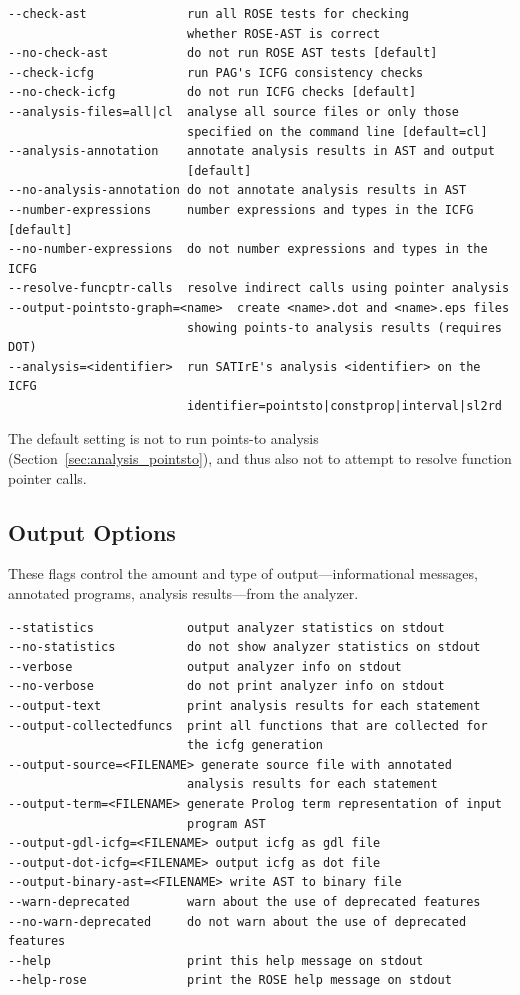 \documentclass[a4paper,12pt]{report}
\begin{document}
{\footnotesize
\begin{verbatim}
--check-ast              run all ROSE tests for checking
                         whether ROSE-AST is correct
--no-check-ast           do not run ROSE AST tests [default]
--check-icfg             run PAG's ICFG consistency checks
--no-check-icfg          do not run ICFG checks [default]
--analysis-files=all|cl  analyse all source files or only those
                         specified on the command line [default=cl]
--analysis-annotation    annotate analysis results in AST and output
                         [default]
--no-analysis-annotation do not annotate analysis results in AST
--number-expressions     number expressions and types in the ICFG [default]
--no-number-expressions  do not number expressions and types in the ICFG
--resolve-funcptr-calls  resolve indirect calls using pointer analysis
--output-pointsto-graph=<name>  create <name>.dot and <name>.eps files
                         showing points-to analysis results (requires DOT)
--analysis=<identifier>  run SATIrE's analysis <identifier> on the ICFG
                         identifier=pointsto|constprop|interval|sl2rd
\end{verbatim}
}

The default setting is not to run points-to analysis
(Section~\ref{sec:analysis_pointsto}), and thus also not to attempt to
resolve function pointer calls.

\subsection{Output Options}

These flags control the amount and type of output---informational messages,
annotated programs, analysis results---from the analyzer.

{\footnotesize
\begin{verbatim}
--statistics             output analyzer statistics on stdout
--no-statistics          do not show analyzer statistics on stdout
--verbose                output analyzer info on stdout
--no-verbose             do not print analyzer info on stdout
--output-text            print analysis results for each statement
--output-collectedfuncs  print all functions that are collected for
                         the icfg generation
--output-source=<FILENAME> generate source file with annotated 
                         analysis results for each statement
--output-term=<FILENAME> generate Prolog term representation of input
                         program AST
--output-gdl-icfg=<FILENAME> output icfg as gdl file
--output-dot-icfg=<FILENAME> output icfg as dot file
--output-binary-ast=<FILENAME> write AST to binary file
--warn-deprecated        warn about the use of deprecated features
--no-warn-deprecated     do not warn about the use of deprecated features
--help                   print this help message on stdout
--help-rose              print the ROSE help message on stdout
\end{verbatim}
}
\end{document}
